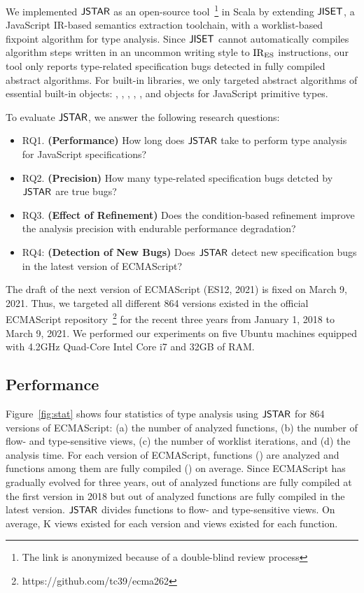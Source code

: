 We implemented $\tool$ as an open-source tool~\footnote{The link is anonymized
because of a double-blind review process} in Scala by extending $\jiset$, a
JavaScript IR-based semantics extraction toolchain, with a worklist-based
fixpoint algorithm for type analysis.  Since $\jiset$ cannot automatically
compiles algorithm steps written in an uncommon writing style to ${\text{IR}_\text{ES}}$
instructions, our tool only reports type-related specification bugs detected in
fully compiled abstract algorithms.  For built-in libraries, we only targeted
abstract algorithms of essential built-in objects: ,
, , , , and objects
for JavaScript primitive types.

To evaluate $\tool$, we answer the following research questions:
\begin{itemize}
  \item RQ1. \textbf{(Performance)} How long does $\tool$ take to perform type
    analysis for JavaScript specifications?
  \item RQ2. \textbf{(Precision)} How many type-related specification bugs
    detcted by $\tool$ are true bugs?
  \item RQ3. \textbf{(Effect of Refinement)} Does the condition-based refinement
    improve the analysis precision with endurable performance degradation?
  \item RQ4: \textbf{(Detection of New Bugs)} Does $\tool$ detect new
    specification bugs in the latest version of ECMAScript?
\end{itemize}
The draft of the next version of ECMAScript (ES12, 2021) is fixed on March 9,
2021.  Thus, we targeted all different 864 versions existed in the official
ECMAScript repository~\footnote{https://github.com/tc39/ecma262} for the recent
three years from January 1, 2018 to March 9, 2021.  We performed our experiments
on five Ubuntu machines equipped with 4.2GHz Quad-Core Intel Core i7 and 32GB of
RAM.


\subsection{Performance}\label{sec:performance}

Figure~\ref{fig:stat} shows four statistics of type analysis using $\tool$ for
864 versions of ECMAScript: (a) the number of analyzed functions, (b) the number
of flow- and type-sensitive views, (c) the number of worklist iterations, and
(d) the analysis time.  For each version of ECMAScript, 
functions () are analyzed and  functions among
them are fully compiled () on average.  Since ECMAScript has
gradually evolved for three years,  out of  analyzed
functions are fully compiled at the first version in 2018 but  out
of  analyzed functions are fully compiled in the latest version.
$\tool$ divides functions to flow- and type-sensitive views.  On average,
K views existed for each version and  views existed for
each function.

